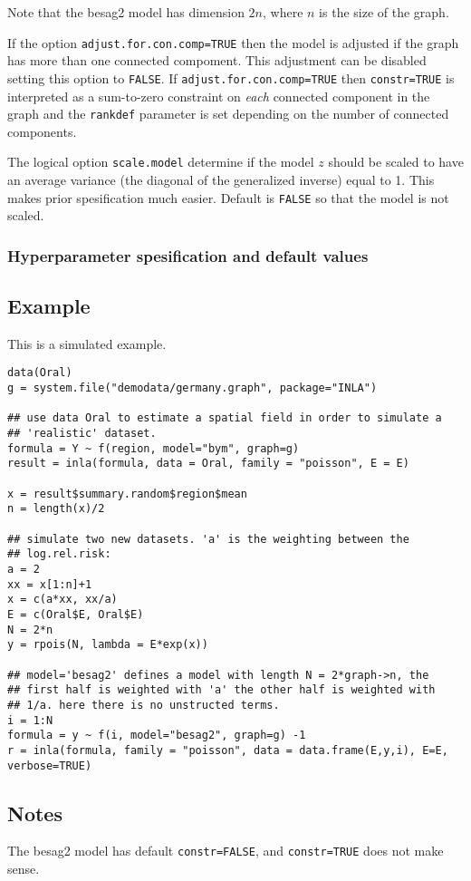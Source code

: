 \documentclass[a4paper,11pt]{article}
\begin{document}
Note that the besag2 model has dimension $2 n$, where $n$ is the size
of the graph.

If the option \verb|adjust.for.con.comp=TRUE| then the model is
adjusted if the graph has more than one connected compoment. This
adjustment can be disabled setting this option to \texttt{FALSE}. If
\verb|adjust.for.con.comp=TRUE| then \texttt{constr=TRUE} is
interpreted as a sum-to-zero constraint on \emph{each} connected
component in the graph and the \texttt{rankdef} parameter is set
depending on the number of connected components.

The logical option \verb|scale.model| determine if the model $z$
should be scaled to have an average variance (the diagonal of the
generalized inverse) equal to 1. This makes prior spesification much
easier. Default is \verb|FALSE| so that the model is not scaled.



\subsubsection*{Hyperparameter spesification and default values}




\subsection*{Example}

This is a simulated example.

\begin{verbatim}
data(Oral)
g = system.file("demodata/germany.graph", package="INLA")

## use data Oral to estimate a spatial field in order to simulate a
## 'realistic' dataset.
formula = Y ~ f(region, model="bym", graph=g)
result = inla(formula, data = Oral, family = "poisson", E = E)

x = result$summary.random$region$mean
n = length(x)/2

## simulate two new datasets. 'a' is the weighting between the
## log.rel.risk:
a = 2
xx = x[1:n]+1
x = c(a*xx, xx/a)
E = c(Oral$E, Oral$E)
N = 2*n
y = rpois(N, lambda = E*exp(x))

## model='besag2' defines a model with length N = 2*graph->n, the
## first half is weighted with 'a' the other half is weighted with
## 1/a. here there is no unstructed terms.
i = 1:N
formula = y ~ f(i, model="besag2", graph=g) -1
r = inla(formula, family = "poisson", data = data.frame(E,y,i), E=E, verbose=TRUE)
\end{verbatim}




\subsection*{Notes}

The besag2 model has default \texttt{constr=FALSE}, and
\texttt{constr=TRUE} does not make sense.
\end{document}
